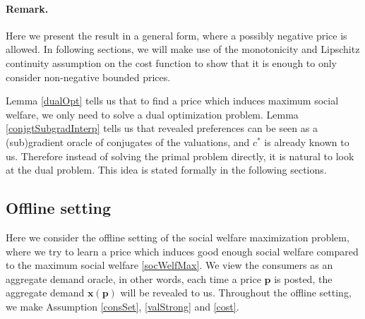 \documentclass{article}
\begin{document}
\paragraph{Remark.}
Here we present the result in a general form, where a possibly negative price is allowed. In following sections, we will make use of the monotonicity and Lipschitz continuity assumption on the cost function to show that it is enough to only consider non-negative bounded prices.

Lemma \ref{dualOpt} tells us that to find a price which induces maximum social welfare, we only need to solve a dual optimization problem. Lemma \ref{conjgtSubgradInterp} tells us that revealed preferences can be seen as a (sub)gradient oracle of conjugates of the valuations, and $c^*$ is already known to us. Therefore instead of solving the primal problem directly, it is natural to look at the dual problem. This idea is stated formally in the following sections.

\subsection{Offline setting}\label{offlineSec}
Here we consider the offline setting of the social welfare maximization problem, where we try to learn a price which induces good enough social welfare compared to the maximum social welfare \eqref{socWelfMax}. We view the consumers as an aggregate demand oracle, in other words, each time a price $\mathbf{p}$ is posted, the aggregate demand $\mathbf{x}(\mathbf{p})$ will be revealed to us. Throughout the offline setting, we make Assumption \ref{consSet}, \ref{valStrong} and \ref{cost}.
\end{document}
